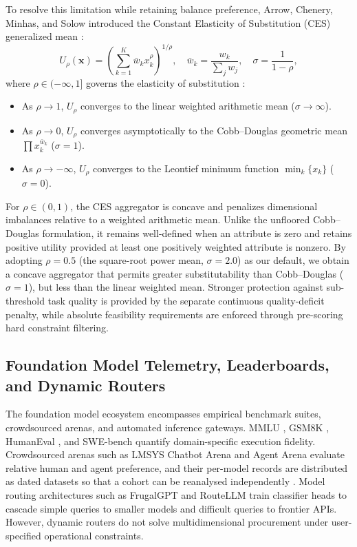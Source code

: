 \documentclass[pdflatex,sn-mathphys-num]{sn-jnl}
\theoremstyle{thmstyleone}
\theoremstyle{thmstylethree}
\begin{document}
To resolve this limitation while retaining balance preference, Arrow, Chenery, Minhas, and Solow introduced the Constant Elasticity of Substitution (CES) generalized mean \cite{arrow1961capital}:
\begin{equation}\label{eq:ces_general}
U_{\rho}(\mathbf{x}) = \left( \sum_{k=1}^K \bar{w}_k x_k^\rho \right)^{1/\rho}, \quad \bar{w}_k = \frac{w_k}{\sum_j w_j}, \quad \sigma = \frac{1}{1 - \rho},
\end{equation}
where $\rho \in (-\infty, 1]$ governs the elasticity of substitution \cite{hardy1934inequalities}:
\begin{itemize}
  \item As $\rho \to 1$, $U_\rho$ converges to the linear weighted arithmetic mean ($\sigma \to \infty$).
  \item As $\rho \to 0$, $U_\rho$ converges asymptotically to the Cobb--Douglas geometric mean $\prod x_k^{\bar{w}_k}$ ($\sigma = 1$).
  \item As $\rho \to -\infty$, $U_\rho$ converges to the Leontief minimum function $\min_k \{x_k\}$ ($\sigma = 0$).
\end{itemize}
For $\rho \in (0,1)$, the CES aggregator is concave and
penalizes dimensional imbalances relative to a weighted
arithmetic mean. Unlike the unfloored Cobb--Douglas
formulation, it remains well-defined when an attribute
is zero and retains positive utility provided at least
one positively weighted attribute is nonzero. By
adopting $\rho = 0.5$ (the square-root power mean,
$\sigma = 2.0$) as our default, we obtain a concave
aggregator that permits greater substitutability than
Cobb--Douglas ($\sigma = 1$), but less than the linear
weighted mean. Stronger protection against sub-threshold
task quality is provided by the separate continuous
quality-deficit penalty, while absolute feasibility
requirements are enforced through pre-scoring hard
constraint filtering.

\subsection{Foundation Model Telemetry, Leaderboards, and Dynamic Routers}

The foundation model ecosystem encompasses empirical benchmark suites, crowdsourced arenas, and automated inference gateways. MMLU \cite{hendrycks2020measuring}, GSM8K \cite{cobbe2021gsm8k}, HumanEval \cite{chen2021evaluating}, and SWE-bench \cite{jimenez2023swe} quantify domain-specific execution fidelity. Crowdsourced arenas such as LMSYS Chatbot Arena \cite{zheng2024judging} and Agent Arena evaluate relative human and agent preference, and their per-model records are distributed as dated datasets so that a cohort can be reanalysed independently \cite{arena2025}. Model routing architectures such as FrugalGPT \cite{chen2023frugalgpt} and RouteLLM \cite{ong2024routellm} train classifier heads to cascade simple queries to smaller models and difficult queries to frontier APIs. However, dynamic routers do not solve multidimensional procurement under user-specified operational constraints.
\end{document}
